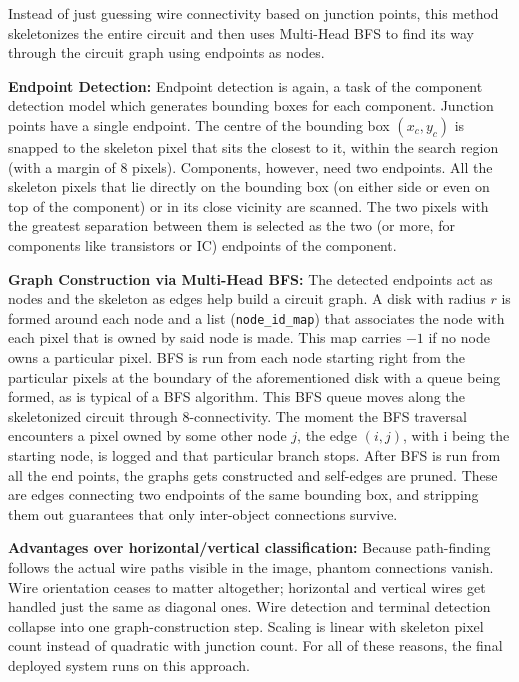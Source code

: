 Instead of just guessing wire connectivity based on junction points, this method skeletonizes the entire circuit and then uses Multi-Head BFS to find its way through the circuit graph using endpoints as nodes.

\textbf{Endpoint Detection:} Endpoint detection is again, a task of the component detection model which generates bounding boxes for each component. Junction points have a single endpoint. The centre of the bounding box $(x_c, y_c)$ is snapped to the skeleton pixel that sits the closest to it, within the search region (with a margin of 8 pixels). Components, however, need two endpoints. All the skeleton pixels that lie directly on the bounding box (on either side or even on top of the component) or in its close vicinity are scanned. The two pixels with the greatest separation between them is selected as the two (or more, for components like transistors or IC) endpoints of the component.

\textbf{Graph Construction via Multi-Head BFS:} The detected endpoints act as nodes and the skeleton as edges help build a circuit graph. A disk with radius $r$ is formed around each node and a list (\texttt{node\_id\_map}) that associates the node with each pixel that is owned by said node is made. This map carries $-1$ if no node owns a particular pixel. BFS is run from each node starting right from the particular pixels at the boundary of the aforementioned disk with a queue being formed, as is typical of a BFS algorithm. This BFS queue moves along the skeletonized circuit through 8-connectivity. The moment the BFS traversal encounters a pixel owned by some other node $j$, the edge $(i, j)$, with i being the starting node, is logged and that particular branch stops. After BFS is run from all the end points, the graphs gets constructed and self-edges are pruned. These are edges connecting two endpoints of the same bounding box, and stripping them out guarantees that only inter-object connections survive.

\textbf{Advantages over horizontal/vertical classification:} Because path-finding follows the actual wire paths visible in the image, phantom connections vanish. Wire orientation ceases to matter altogether; horizontal and vertical wires get handled just the same as diagonal ones. Wire detection and terminal detection collapse into one graph-construction step. Scaling is linear with skeleton pixel count instead of quadratic with junction count. For all of these reasons, the final deployed system runs on this approach.

